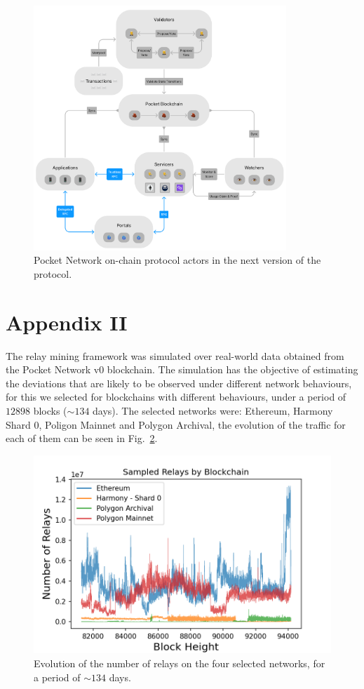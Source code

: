 \documentclass[runningheads]{llncs}
\begin{document}
\begin{figure}
    \centering
    \includegraphics[width=0.85\textwidth]{v1_actors.png}
    \caption{Pocket Network on-chain protocol actors in the next version of the protocol.} \label{fig:v1-actors}
\end{figure}

\newpage
\section*{Appendix II}

The relay mining framework was simulated over real-world data obtained from the Pocket Network v0 blockchain. The simulation has the objective of estimating the deviations that are likely to be observed under different network behaviours, for this we selected for blockchains with different behaviours, under a period of $12898$ blocks ($\sim 134$ days). The selected networks were: Ethereum, Harmony Shard 0, Poligon Mainnet and Polygon Archival, the evolution of the traffic for each of them can be seen in Fig.~\ref{fig:v0-relays}. 
\begin{figure}
    \includegraphics[width=\textwidth]{v0_all_relays.png}
    \caption{Evolution of the number of relays on the four selected networks, for a period of $\sim 134$ days.} \label{fig:v0-relays}
\end{figure}
\end{document}
